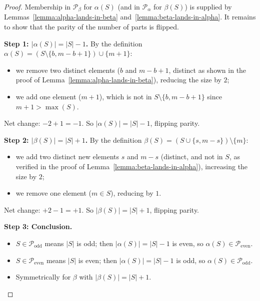\begin{proof}\leanok
Membership in $\mathcal{P}_\beta$ for $\alpha(S)$ (and in $\mathcal{P}_\alpha$ for $\beta(S)$) is supplied by Lemmas~\ref{lemma:alpha-lands-in-beta} and~\ref{lemma:beta-lands-in-alpha}. It remains to show that the parity of the number of parts is flipped.

\textbf{Step 1: $|\alpha(S)| = |S| - 1$.}
By the definition $\alpha(S) = (S \setminus \{b, m - b + 1\}) \cup \{m + 1\}$:
\begin{itemize}
\item we remove two distinct elements ($b$ and $m - b + 1$, distinct as shown in the proof of Lemma~\ref{lemma:alpha-lands-in-beta}), reducing the size by $2$;
\item we add one element ($m + 1$), which is not in $S \setminus \{b, m - b + 1\}$ since $m + 1 > \max(S)$.
\end{itemize}
Net change: $-2 + 1 = -1$. So $|\alpha(S)| = |S| - 1$, flipping parity.

\textbf{Step 2: $|\beta(S)| = |S| + 1$.}
By the definition $\beta(S) = (S \cup \{s, m - s\}) \setminus \{m\}$:
\begin{itemize}
\item we add two distinct new elements $s$ and $m - s$ (distinct, and not in $S$, as verified in the proof of Lemma~\ref{lemma:beta-lands-in-alpha}), increasing the size by $2$;
\item we remove one element ($m \in S$), reducing by $1$.
\end{itemize}
Net change: $+2 - 1 = +1$. So $|\beta(S)| = |S| + 1$, flipping parity.

\textbf{Step 3: Conclusion.}
\begin{itemize}
\item $S \in \mathcal{P}_\mathrm{odd}$ means $|S|$ is odd; then $|\alpha(S)| = |S| - 1$ is even, so $\alpha(S) \in \mathcal{P}_\mathrm{even}$.
\item $S \in \mathcal{P}_\mathrm{even}$ means $|S|$ is even; then $|\alpha(S)| = |S| - 1$ is odd, so $\alpha(S) \in \mathcal{P}_\mathrm{odd}$.
\item Symmetrically for $\beta$ with $|\beta(S)| = |S| + 1$.
\end{itemize}
\end{proof}

